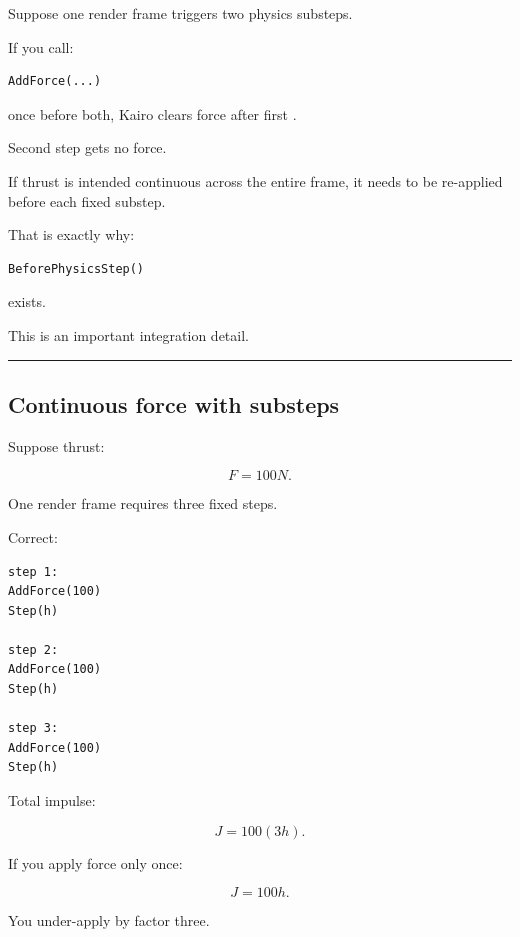 \hypertarget{06-engine-ii-ch037-render-frame-input-versus-physics-step-input}{}

Suppose one render frame triggers two physics substeps.

If you call:

\begin{verbatim}
AddForce(...)
\end{verbatim}

once before both, Kairo clears force after first .

Second step gets no force.

If thrust is intended continuous across the entire frame, it needs to be re-applied before each fixed substep.

That is exactly why:

\begin{verbatim}
BeforePhysicsStep()
\end{verbatim}

exists.

This is an important integration detail.

\begin{center}\rule{0.5\linewidth}{0.5pt}\end{center}

\subsection{Continuous force with substeps}\label{06-engine-ii-ch037-continuous-force-with-substeps}

\hypertarget{06-engine-ii-ch037-continuous-force-with-substeps}{}

Suppose thrust:

\[
F=100N.
\]

One render frame requires three fixed steps.

Correct:

\begin{verbatim}
step 1:
AddForce(100)
Step(h)

step 2:
AddForce(100)
Step(h)

step 3:
AddForce(100)
Step(h)
\end{verbatim}

Total impulse:

\[
J
=
100(3h).
\]

If you apply force only once:

\[
J
=
100h.
\]

You under-apply by factor three.


